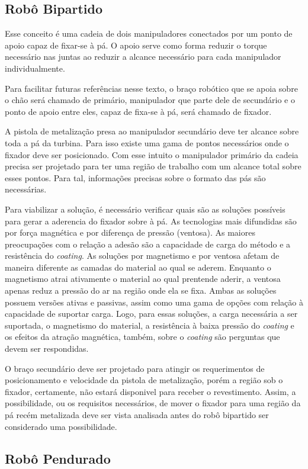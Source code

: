 \subsection{Robô Bipartido}

Esse conceito é uma cadeia de dois manipuladores conectados por um ponto de
apoio capaz de fixar-se à pá. O apoio serve como forma reduzir o torque
necessário nas juntas ao reduzir a alcance necessário para cada manipulador
individualmente.

Para facilitar futuras referências nesse texto, o braço robótico que se
apoia sobre o chão será chamado de primário, manipulador que parte dele de
secundário e o ponto de apoio entre eles, capaz de fixa-se à pá, será chamado de
fixador.

 A pistola de metalização presa ao manipulador secundário deve ter
alcance sobre toda a pá da turbina. Para isso existe uma gama de pontos
necessários onde o fixador deve ser posicionado. Com esse intuito o
manipulador primário da cadeia precisa ser projetado para ter uma região de
trabalho com um alcance total sobre esses pontos. Para tal, informações precisas
sobre o formato das pás são necessárias.

Para viabilizar a solução, é necessário verificar quais são as soluções
possíveis para gerar a aderencia do fixador sobre à pá. As tecnologias mais
difundidas são por força magnética e por diferença de pressão (ventosa).
As maiores preocupações com o relação a adesão são a capacidade de carga do
método e a resistência do \textit{coating}. As soluções por magnetismo e
por ventosa afetam de maneira diferente as camadas do material ao qual se
aderem. Enquanto o magnetismo atrai ativamente o material ao qual prentende
aderir, a ventosa apenas reduz a pressão do ar na região onde ela se fixa. Ambas
as soluções possuem versões ativas e passivas, assim como uma gama de opções com
relação à capacidade de suportar carga. Logo, para essas soluções, a carga
necessária a ser suportada, o magnetismo do material, a resistência à baixa
pressão do \textit{coating} e os efeitos da atração magnética, também, sobre o
\textit{coating} são perguntas que devem ser respondidas.

O braço secundário deve ser projetado para atingir os requerimentos de
posicionamento e velocidade da pistola de metalização, porém a região sob o
fixador, certamente, não estará disponivel para receber o revestimento. Assim, a
possibilidade, ou os requisitos necessários, de mover o fixador para uma região
da pá recém metalizada deve ser vista analisada antes do robô bipartido ser
considerado uma possibilidade.

\subsection{Robô Pendurado} 
